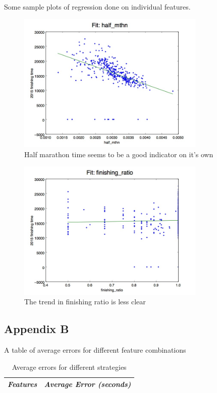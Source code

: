 \documentclass{article}
\begin{document}
Some sample plots of regression done on individual features.

\begin{figure}[ht!]
\centering
\includegraphics[width=0.8\textwidth]{half_mthn.jpg}
\caption{Half marathon time seems to be a good indicator on it's own}
\label{fig:halfmthntime}
\end{figure}

\begin{figure}[ht!]
\centering
\includegraphics[width=0.8\textwidth]{finishing_ratio.jpg}
\caption{The trend in finishing ratio is less clear}
\label{fig:frtime}
\end{figure}

\subsection*{Appendix B}

A table of average errors for different feature combinations

\begin{table}[ht!]
    \centering
    \begin{tabular}{| l | l |}
        \hline
        {\em Features} & {\em Average Error (seconds)}  \\ \hline
    \end{tabular}
    \caption{Average errors for different strategies}
    \label{tbl:avgerrs}
\end{table}
\end{document}

